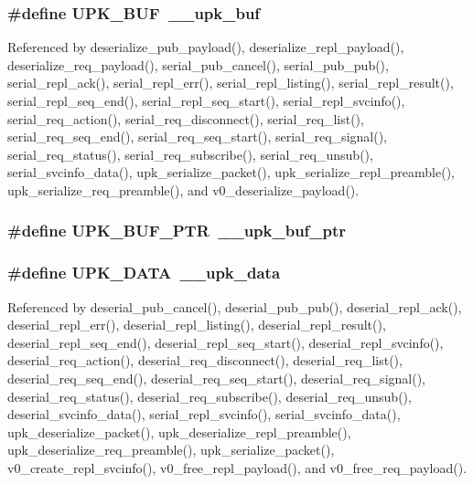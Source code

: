 \subsubsection[{UPK\_\-BUF}]{\setlength{\rightskip}{0pt plus 5cm}\#define UPK\_\-BUF~\_\-\_\-upk\_\-buf}\label{group__client__protocol_ga2f8e3fdadca458dd0df4929c67687354}


Referenced by deserialize\_\-pub\_\-payload(), deserialize\_\-repl\_\-payload(), deserialize\_\-req\_\-payload(), serial\_\-pub\_\-cancel(), serial\_\-pub\_\-pub(), serial\_\-repl\_\-ack(), serial\_\-repl\_\-err(), serial\_\-repl\_\-listing(), serial\_\-repl\_\-result(), serial\_\-repl\_\-seq\_\-end(), serial\_\-repl\_\-seq\_\-start(), serial\_\-repl\_\-svcinfo(), serial\_\-req\_\-action(), serial\_\-req\_\-disconnect(), serial\_\-req\_\-list(), serial\_\-req\_\-seq\_\-end(), serial\_\-req\_\-seq\_\-start(), serial\_\-req\_\-signal(), serial\_\-req\_\-status(), serial\_\-req\_\-subscribe(), serial\_\-req\_\-unsub(), serial\_\-svcinfo\_\-data(), upk\_\-serialize\_\-packet(), upk\_\-serialize\_\-repl\_\-preamble(), upk\_\-serialize\_\-req\_\-preamble(), and v0\_\-deserialize\_\-payload().

\subsubsection[{UPK\_\-BUF\_\-PTR}]{\setlength{\rightskip}{0pt plus 5cm}\#define UPK\_\-BUF\_\-PTR~\_\-\_\-upk\_\-buf\_\-ptr}\label{group__client__protocol_gaf916eeceef858d64ba063052210159f9}
\subsubsection[{UPK\_\-DATA}]{\setlength{\rightskip}{0pt plus 5cm}\#define UPK\_\-DATA~\_\-\_\-upk\_\-data}\label{group__client__protocol_ga3c63e3d81e8528b3300170bb020ef84b}


Referenced by deserial\_\-pub\_\-cancel(), deserial\_\-pub\_\-pub(), deserial\_\-repl\_\-ack(), deserial\_\-repl\_\-err(), deserial\_\-repl\_\-listing(), deserial\_\-repl\_\-result(), deserial\_\-repl\_\-seq\_\-end(), deserial\_\-repl\_\-seq\_\-start(), deserial\_\-repl\_\-svcinfo(), deserial\_\-req\_\-action(), deserial\_\-req\_\-disconnect(), deserial\_\-req\_\-list(), deserial\_\-req\_\-seq\_\-end(), deserial\_\-req\_\-seq\_\-start(), deserial\_\-req\_\-signal(), deserial\_\-req\_\-status(), deserial\_\-req\_\-subscribe(), deserial\_\-req\_\-unsub(), deserial\_\-svcinfo\_\-data(), serial\_\-repl\_\-svcinfo(), serial\_\-svcinfo\_\-data(), upk\_\-deserialize\_\-packet(), upk\_\-deserialize\_\-repl\_\-preamble(), upk\_\-deserialize\_\-req\_\-preamble(), upk\_\-serialize\_\-packet(), v0\_\-create\_\-repl\_\-svcinfo(), v0\_\-free\_\-repl\_\-payload(), and v0\_\-free\_\-req\_\-payload().

